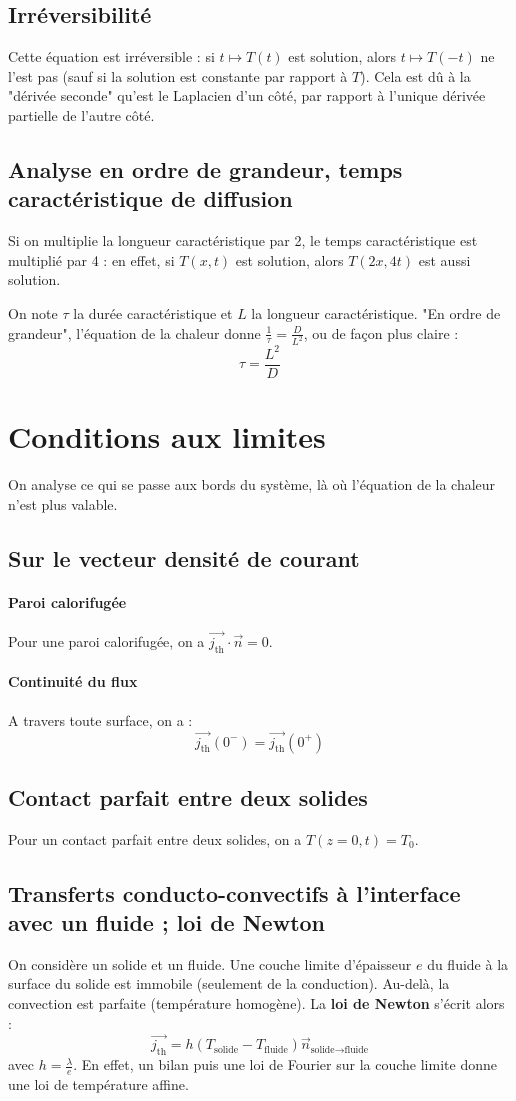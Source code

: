 \documentclass[french]{book}
\theoremstyle{plain}
\theoremstyle{definition}
\theoremstyle{remark}
\begin{document}
\subsection{Irréversibilité}
Cette équation est irréversible : si $t\mapsto T(t)$ est solution, alors $t\mapsto T(-t)$ ne l'est pas (sauf si la solution est constante par rapport à $T$). Cela est dû à la "dérivée seconde" qu'est le Laplacien d'un côté, par rapport à l'unique dérivée partielle de l'autre côté.
\subsection{Analyse en ordre de grandeur, temps caractéristique de diffusion}
Si on multiplie la longueur caractéristique par 2, le temps caractéristique est multiplié par 4 : en effet, si $T(x,t)$ est solution, alors $T(2x,4t)$ est aussi solution. \\ \par On note $\tau$ la durée caractéristique et $L$ la longueur caractéristique. "En ordre de grandeur", l'équation de la chaleur donne $\displaystyle\frac{1}{\tau}=\frac{D}{L^2}$, ou de façon plus claire : $$\tau=\frac{L^2}{D}$$
\section{Conditions aux limites}
On analyse ce qui se passe aux bords du système, là où l'équation de la chaleur n'est plus valable.
\subsection{Sur le vecteur densité de courant}
\paragraph{Paroi calorifugée} Pour une paroi calorifugée, on a $\overrightarrow{j_\text{th}}\cdot\overrightarrow{n}=0$.
\paragraph{Continuité du flux}
A travers toute surface, on a : $$\overrightarrow{j_\text{th}}(0^-)=\overrightarrow{j_\text{th}}(0^+)$$
\subsection{Contact parfait entre deux solides}
Pour un contact parfait entre deux solides, on a $T(z=0,t)=T_0$.
\subsection{Transferts conducto-convectifs à l'interface avec un fluide ; loi de Newton}
On considère un solide et un fluide. Une couche limite d’épaisseur
$e$ du fluide à la surface du solide est immobile (seulement de la conduction). Au-delà, la convection est parfaite (température homogène). La \textbf{loi de Newton} s’écrit alors : $$\overrightarrow{j_\text{th}}=h\left(T_\text{solide}-T_\text{fluide}\right)\overrightarrow{n}_{\text{solide}\to\text{fluide}}$$ avec $\displaystyle h=\frac{\lambda}{e}$. En effet, un bilan puis une loi de Fourier sur la couche limite donne une loi de température affine.
\end{document}
